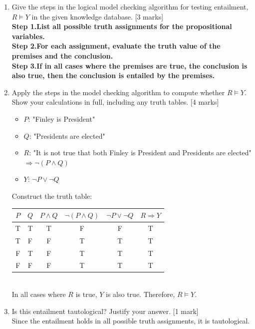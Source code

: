 \begin{enumerate}
    \begin{enumerate}
        \item[(i)] Give the steps in the logical model checking algorithm for testing entailment, $R \models Y$ in the given knowledge database. [3 marks] \\
        {\color{blue}
            \textbf{Step 1.List all possible truth assignments for the propositional variables.} \\
            \textbf{Step 2.For each assignment, evaluate the truth value of the premises and the conclusion.} \\
            \textbf{Step 3.If in all cases where the premises are true, the conclusion is also true, then the conclusion is entailed by the premises.} \\
        }
        \item[(ii)] Apply the steps in the model checking algorithm to compute whether $R \models Y$. Show your calculations in full, including any truth tables. [4 marks] \\
        {\color{blue}
        \begin{itemize}
            \item $P$: "Finley is President"
            \item $Q$: "Presidents are elected"
            \item $R$: "It is not true that both Finley is President and Presidents are elected" $\Rightarrow \lnot (P \land Q)$
            \item $Y$: $\lnot P \lor \lnot Q$
        \end{itemize}
        Construct the truth table: \\
        \begin{tabular}{|c|c|c|c|c|c|}
        \hline
        $P$ & $Q$ & $P \land Q$ & $\lnot (P \land Q)$ & $\lnot P \lor \lnot Q$ & $R \Rightarrow Y$ \\
        \hline
        T & T & T & F & F & T \\
        T & F & F & T & T & T \\
        F & T & F & T & T & T \\
        F & F & F & T & T & T \\
        \hline
        \end{tabular} \\
        In all cases where $R$ is true, $Y$ is also true. Therefore, $R \models Y$.
        }
        \item[(iii)] Is this entailment tautological? Justify your answer. [1 mark] \\
        {\color{blue}
        Since the entailment holds in all possible truth assignments, it is tautological.
        }
    \end{enumerate}
\end{enumerate}

